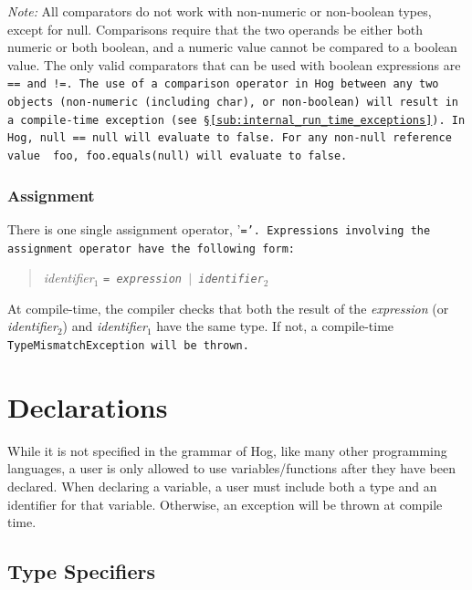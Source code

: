 \documentclass{article}
\begin{document}
\emph{Note:} All comparators do not work with non-numeric or non-boolean types,
except for null. Comparisons require that the two operands be either both numeric
or both boolean, and a numeric value cannot be compared to a boolean value. The
only valid comparators that can be used with boolean expressions are \tt == \rm
and \tt !=\rm. The use of a comparison operator in Hog between any two objects
(non-numeric (including char), or non-boolean) will result in a compile-time
exception (see \S \ref{sub:internal_run_time_exceptions}). In Hog, \tt null ==
null \rm will evaluate to \tt false\rm. For any non-null reference value \tt
foo\rm, \tt foo.equals(null) \rm will evaluate to \tt false\rm.


\subsubsection{Assignment} %
\label{ssub:assignment}

There is one single assignment operator, '\tt =\rm'. Expressions involving the
assignment operator have the following form:

\begin{quotation}
\emph{identifier}$_1$ \tt = \rm \emph{expression} $|$ \emph{identifier}$_2$
\end{quotation}

At compile-time, the compiler checks that both the result of the \emph{expression}
(or \emph{identifier}$_2$) and \emph{identifier}$_1$ have the same type. If not, a
compile-time \tt TypeMismatchException \rm will be thrown.




\section{Declarations} %
\label{sec:declarations}

While it is not specified in the grammar of Hog, like many other programming
languages, a user is only allowed to use variables/functions after they have been
declared. When declaring a variable, a user must include both a type and an
identifier for that variable. Otherwise, an exception will be thrown at compile
time.

\subsection{Type Specifiers} %
\label{sub:type_specifiers}
\end{document}
